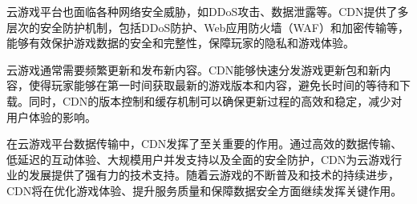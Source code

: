 云游戏平台也面临各种网络安全威胁，如DDoS攻击、数据泄露等。CDN提供了多层次的安全防护机制，包括DDoS防护、Web应用防火墙（WAF）和加密传输等，能够有效保护游戏数据的安全和完整性，保障玩家的隐私和游戏体验。

云游戏通常需要频繁更新和发布新内容。CDN能够快速分发游戏更新包和新内容，使得玩家能够在第一时间获取最新的游戏版本和内容，避免长时间的等待和下载。同时，CDN的版本控制和缓存机制可以确保更新过程的高效和稳定，减少对用户体验的影响。

在云游戏平台数据传输中，CDN发挥了至关重要的作用。通过高效的数据传输、低延迟的互动体验、大规模用户并发支持以及全面的安全防护，CDN为云游戏行业的发展提供了强有力的技术支持。随着云游戏的不断普及和技术的持续进步，CDN将在优化游戏体验、提升服务质量和保障数据安全方面继续发挥关键作用。